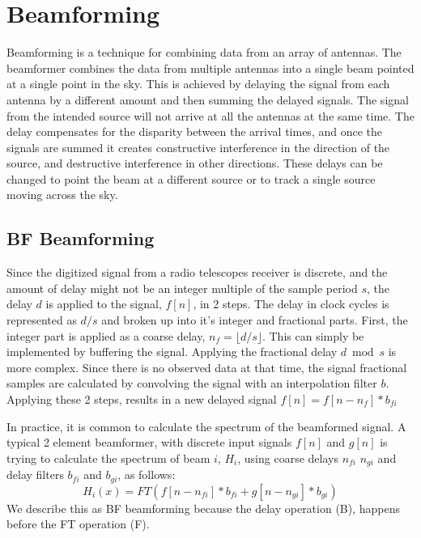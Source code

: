

\section{Beamforming}
\label{Real Time Radio Astronomy Algorithms:Beamforming}
Beamforming is a technique for combining data from an array of antennas.
The beamformer combines the data from multiple antennas into a single beam pointed at a single point in the sky.
This is achieved by delaying the signal from each antenna by a different amount and then summing the delayed signals. 
The signal from the intended source will not arrive at all the antennas at the same time. 
The delay compensates for the disparity between the arrival times, and once the signals are summed it creates constructive interference in the direction of the source, and destructive interference in other directions. 
These delays can be changed to point the beam at a different source or to track a single source moving across the sky.


\subsection{BF Beamforming}
Since the digitized signal from a radio telescopes receiver is discrete, and the amount of delay might not be an integer multiple of the sample period $s$, the delay $d$ is applied to the signal, $f[n]$, in 2 steps. 
The delay in clock cycles is represented as $d/s$ and broken up into it's integer and fractional parts. 
First, the integer part is applied as a coarse delay, $n_f = \lfloor d/s \rfloor$. 
This can simply be implemented by buffering the signal.
Applying the  fractional delay $d \bmod s$ is more complex. 
Since there is no observed data at that time, the signal fractional samples are calculated by convolving the signal with an interpolation filter $b$.
Applying these 2 steps, results in a new delayed signal $f[n] = f[n-n_f]\ast b_{fi}$

In practice, it is common to calculate the spectrum of the beamformed signal. 
A typical 2 element beamformer, with discrete input signals $f[n]$ and $g[n]$ is trying to calculate the spectrum of beam $i$, $H_i$, using coarse delays $n_{fi}$  $n_{gi}$ and delay filters $b_{fi}$ and $b_{gi}$, as follows: 
\[H_i(x) = FT(f[n-n_{fi}]\ast b_{fi} + g[n-n_{gi}]\ast b_{gi})\]
We describe this as BF beamforming because the delay operation (B), happens before the FT operation (F).


